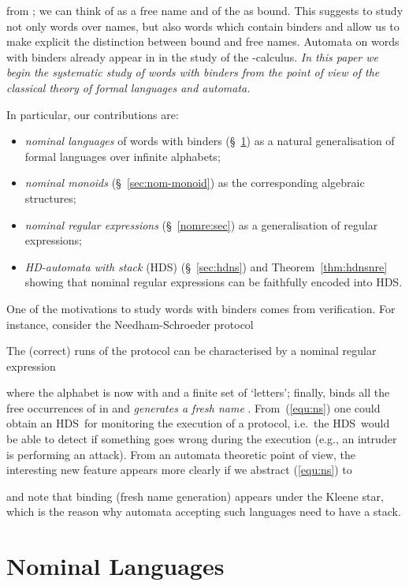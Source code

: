 \documentclass[runningheads,a4paper]{llncs}
\newcommand{\hdns}{HDS}
\begin{document}
from \cite{tze11}; we can think of  as a free name and of the
 as bound. This suggests to study not only words over
names, but also words which contain binders and allow us to make
explicit the distinction between bound and free names. Automata on
words with binders already appear in \cite{stirling:fossacs09} in the
study of the -calculus. \emph{In this paper we begin the
  systematic study of words with binders from the point of view of the
  classical theory of formal languages and automata.}

\medskip\noindent In particular, our contributions are:
\begin{itemize}
\item \emph{nominal languages} of words with binders
  (\S~\ref{sec:nomlang}) as a natural generalisation of formal
  languages over infinite alphabets;
\item \emph{nominal monoids} (\S~\ref{sec:nom-monoid}) as the
  corresponding algebraic structures;
\item \emph{nominal regular expressions} (\S~\ref{nomre:sec}) as a
  generalisation of regular expressions;
\item \emph{HD-automata with stack} (\hdns) (\S~\ref{sec:hdns}) and
  Theorem~\ref{thm:hdnsnre} showing that nominal regular expressions
  can be faithfully encoded into \hdns.
\end{itemize}

\noindent One of the motivations to study words with binders comes
from verification. For instance, consider the Needham-Schroeder
protocol

The (correct) runs of the protocol can be characterised by a nominal
regular expression

where the alphabet is now  with 
and  a finite set of
`letters'; finally,  binds all the free
occurrences of  in  and \emph{generates a fresh name} .
From~(\ref{equ:ns}) one could obtain an \hdns\ for monitoring the
execution of a protocol, i.e.\ the \hdns\ would be able to detect if
something goes wrong during the execution (e.g., an intruder is
performing an attack). From an automata theoretic point of view, the
interesting new feature appears more clearly if we abstract
(\ref{equ:ns}) to

and note that binding (fresh name generation) 
appears under the Kleene star, which is the reason why automata
accepting such languages need to have a stack.

\section{Nominal Languages}\label{sec:nomlang}
\newcommand{\letters}{\mathcal{S}}
\newcommand{\mwords}{\mathbf{M}}
\newcommand{\gwords}{\mathbf{G}}
\newcommand{\lwords}{\mathbf{L}}
\newcommand{\swords}{\mathbf{S}}
\newcommand{\sltr}{\mathrm{sl}}
\newcommand{\lgtr}{\mathrm{lg}}
\newcommand{\gmtr}{\mathrm{gm}}
\newcommand{\mpwtr}{f_\mwords}
\end{document}

